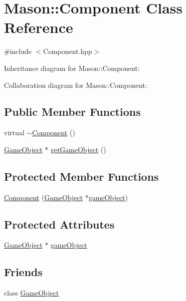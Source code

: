 \hypertarget{class_mason_1_1_component}{}\section{Mason\+:\+:Component Class Reference}
\label{class_mason_1_1_component}


{\ttfamily \#include $<$Component.\+hpp$>$}



Inheritance diagram for Mason\+:\+:Component\+:


Collaboration diagram for Mason\+:\+:Component\+:
\subsection*{Public Member Functions}
\begin{DoxyCompactItemize}
\item 
virtual \hyperlink{class_mason_1_1_component_ab8378fa275af98e568a7e91d33d867af}{$\sim$\+Component} ()
\item 
\hyperlink{class_mason_1_1_game_object}{Game\+Object} $\ast$ \hyperlink{class_mason_1_1_component_abed36db99f1ee0ba84a5fb8485e17428}{get\+Game\+Object} ()
\end{DoxyCompactItemize}
\subsection*{Protected Member Functions}
\begin{DoxyCompactItemize}
\item 
\hyperlink{class_mason_1_1_component_a98d3a7d72f88dc7e67c946c78afb8243}{Component} (\hyperlink{class_mason_1_1_game_object}{Game\+Object} $\ast$\hyperlink{class_mason_1_1_component_a30030370c35f5562cbbbb0927b0448c8}{game\+Object})
\end{DoxyCompactItemize}
\subsection*{Protected Attributes}
\begin{DoxyCompactItemize}
\item 
\hyperlink{class_mason_1_1_game_object}{Game\+Object} $\ast$ \hyperlink{class_mason_1_1_component_a30030370c35f5562cbbbb0927b0448c8}{game\+Object}
\end{DoxyCompactItemize}
\subsection*{Friends}
\begin{DoxyCompactItemize}
\item 
class \hyperlink{class_mason_1_1_component_a00df87c957d8f7ee0fc51f07a0542f4a}{Game\+Object}
\end{DoxyCompactItemize}


